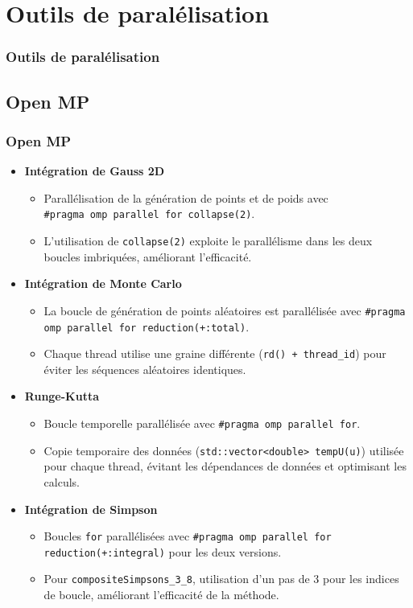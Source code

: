 \documentclass[10pt]{beamer}
\begin{document}
\section{Outils de paralélisation}

\begin{frame}
    \frametitle{Outils de paralélisation}
    \tableofcontents[currentsection]
\end{frame}

\subsection{Open MP}
\begin{frame}
    \frametitle{Open MP}
    \small
    \begin{itemize}
        \item \textbf{Intégration de Gauss 2D }
            \begin{itemize}
                \item Parallélisation de la génération de points et de poids avec \\\texttt{\#pragma omp parallel for collapse(2)}.
                \item L'utilisation de \texttt{collapse(2)} exploite le parallélisme dans les deux boucles imbriquées, améliorant l'efficacité.
            \end{itemize}
        \item \textbf{Intégration de Monte Carlo }
            \begin{itemize}
                \item La boucle de génération de points aléatoires est parallélisée avec \texttt{\#pragma omp parallel for reduction(+:total)}.
                \item Chaque thread utilise une graine différente (\texttt{rd() + thread\_id}) pour éviter les séquences aléatoires identiques.
            \end{itemize}
        \item \textbf{Runge-Kutta }
            \begin{itemize}
                \item Boucle temporelle parallélisée avec \texttt{\#pragma omp parallel for}.
                \item Copie temporaire des données (\texttt{std::vector<double> tempU(u)}) utilisée pour chaque thread, évitant les dépendances de données et optimisant les calculs.
            \end{itemize}
        \item \textbf{Intégration de Simpson}
            \begin{itemize}
                \item Boucles \texttt{for} parallélisées avec \texttt{\#pragma omp parallel for reduction(+:integral)} pour les deux versions.
                \item Pour \texttt{compositeSimpsons\_3\_8}, utilisation d'un pas de 3 pour les indices de boucle, améliorant l'efficacité de la méthode.
            \end{itemize}
    \end{itemize}
\end{frame}
\end{document}
